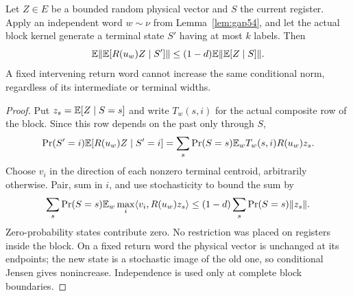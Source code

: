 \begin{lemma}\label{lem:centroid54}
Let $Z\in E$ be a bounded random physical vector and $S$ the current register. Apply an independent word $w\sim\nu$ from Lemma~\ref{lem:gap54}, and let the actual block kernel generate a terminal state $S'$ having at most $k$ labels. Then
\begin{equation}\label{eq:centroid54}
 \mathbb E\lVert \mathbb E[R(u_w)Z\mid S']\rVert\le(1-d)\mathbb E\lVert \mathbb E[Z\mid S]\rVert.
\end{equation}
A fixed intervening return word cannot increase the same conditional norm, regardless of its intermediate or terminal widths.
\end{lemma}
\begin{proof}
Put $z_s=\mathbb E[Z\mid S=s]$ and write $T_w(s,i)$ for the actual composite row of the block. Since this row depends on the past only through $S$,
\[
 \Pr(S'=i)\mathbb E[R(u_w)Z\mid S'=i]
 =\sum_s\Pr(S=s)\mathbb E_w T_w(s,i)R(u_w)z_s.
\]
Choose $v_i$ in the direction of each nonzero terminal centroid, arbitrarily otherwise. Pair, sum in $i$, and use stochasticity to bound the sum by
\[
 \sum_s\Pr(S=s)\mathbb E_w\max_i\langle v_i,R(u_w)z_s\rangle
 \le(1-d)\sum_s\Pr(S=s)\lVert z_s\rVert.
\]
Zero-probability states contribute zero. No restriction was placed on registers inside the block. On a fixed return word the physical vector is unchanged at its endpoints; the new state is a stochastic image of the old one, so conditional Jensen gives nonincrease. Independence is used only at complete block boundaries.
\end{proof}
